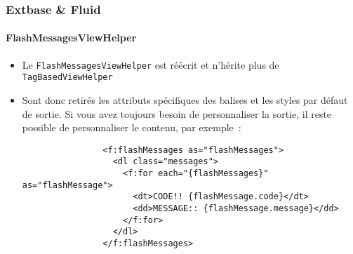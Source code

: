 
\begin{frame}[fragile]
	\frametitle{Extbase \& Fluid}
	\framesubtitle{FlashMessagesViewHelper}

	\lstset{basicstyle=\tiny\ttfamily}

	\begin{itemize}
		\item Le \texttt{FlashMessagesViewHelper} est réécrit et n'hérite plus de
			\texttt{TagBasedViewHelper}

		\item Sont donc retirés les attributs spécifiques des balises et les styles par défaut
		 	de sortie. Si vous avez toujours besoin de personnaliser la sortie, il reste possible
		 	de personnaliser le contenu, par exemple~:

			\begin{lstlisting}
				<f:flashMessages as="flashMessages">
				  <dl class="messages">
				    <f:for each="{flashMessages}" as="flashMessage">
				      <dt>CODE!! {flashMessage.code}</dt>
				      <dd>MESSAGE:: {flashMessage.message}</dd>
				    </f:for>
				  </dl>
				</f:flashMessages>
			\end{lstlisting}

	\end{itemize}

\end{frame}


